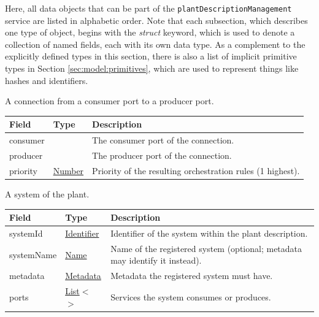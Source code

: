 \documentclass[a4paper]{arrowhead}
\newcommand{\mref}[2][]{{\textcolor{ArrowheadPurple}{\hyperref[sec:model:#2]{\ifstrempty{#1}{#2}{#1}}}}}
\newcommand{\pref}[1]{{\textcolor{ArrowheadGrey}{\hyperref[sec:model:primitives:#1]{#1}}}}
\begin{document}
Here, all data objects that can be part of the \texttt{plant\allowbreak{}Description\allowbreak{}Management} service are listed in alphabetic order.
Note that each subsection, which describes one type of object, begins with the \textit{struct} keyword, which is used to denote a collection of named fields, each with its own data type.
As a complement to the explicitly defined types in this section, there is also a list of implicit primitive types in Section \ref{sec:model:primitives}, which are used to represent things like hashes and identifiers.


A connection from a consumer port to a producer port.


\noindent\begin{tabularx}{\textwidth}{| >{\raggedright\arraybackslash}p{3.9cm} | >{\raggedright\arraybackslash\small}p{5.3cm} | X |} \hline
\rowcolor{gray!33} Field & Type & Description \\ \hline
consumer & \mref{SystemPort} & The consumer port of the connection. \\ \hline
producer & \mref{SystemPort} & The producer port of the connection. \\ \hline
priority & \pref{Number} & Priority of the resulting orchestration rules (1 highest). \\ \hline
\end{tabularx}




A system of the plant.


\noindent\begin{tabularx}{\textwidth}{| >{\raggedright\arraybackslash}p{3.9cm} | >{\raggedright\arraybackslash\small}p{5.3cm} | X |} \hline
\rowcolor{gray!33} Field & Type & Description \\ \hline
system\allowbreak{}Id & \pref{Identifier} & Identifier of the system within the plant description. \\ \hline
system\allowbreak{}Name & \pref{Name} & Name of the registered system (optional; metadata may identify it instead). \\ \hline
metadata & \pref{Metadata} & Metadata the registered system must have. \\ \hline
ports & \pref{List}$<$\allowbreak{}\mref{Port}$>$ & Services the system consumes or produces. \\ \hline
\end{tabularx}
\end{document}
